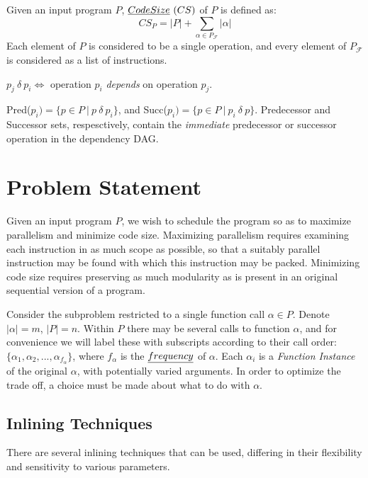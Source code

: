 \documentclass[12pt,twoside]{article}
\begin{document}
\begin{definition} Given an input program $P$, $\emph{Code Size} \ (CS)$ of $P$ is defined as:
	\begin{equation}
		CS_P = |P| + \sum_{\alpha \in P_{\mathcal{F}}} |\alpha|
	\end{equation}
	Each element of $P$ is considered to be a single operation, and every element of $P_{\mathcal{F}}$ is considered as a list of instructions. 
\end{definition}

\begin{definition} $p_j\ \delta\ p_i \iff $ operation $p_i$ \emph{depends} on operation $p_j$.
\end{definition}

\begin{definition} Pred($p_i) = \{p \in P\ |\ p\ \delta\ p_i\}$, and Succ($p_i) = \{p \in P\ |\ p_i\ \delta\ p\}$. Predecessor and Successor sets, respesctively, contain the \emph{immediate} predecessor or successor operation in the dependency DAG.
\end{definition}

\section{Problem Statement}
Given an input program $P$, we wish to schedule the program so as to maximize parallelism and minimize code size. Maximizing parallelism requires examining each instruction in as much scope as possible, so that a suitably parallel instruction may be found with which this instruction may be packed. Minimizing code size requires preserving as much modularity as is present in an original sequential version of a program. 

Consider the subproblem restricted to a single function call $\alpha \in P$. Denote $|\alpha| = m$, $|P| = n$. Within $P$ there may be several calls to function $\alpha$, and for convenience we will label these with subscripts according to their call order: $\{\alpha_1, \alpha_2, ... , \alpha_{f_{\alpha}}\}$, where $f_{\alpha}$ is the $\emph{frequency}$ of $\alpha$. Each $\alpha_i$ is a \emph{Function Instance} of the original $\alpha$, with potentially varied arguments. In order to optimize the trade off, a choice must be made about what to do with $\alpha$.

\subsection{Inlining Techniques}
There are several inlining techniques that can be used, differing in their flexibility and sensitivity to various parameters. 
\end{document}
